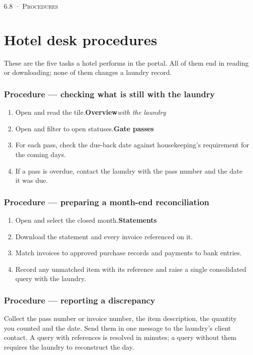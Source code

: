 \documentclass[11pt,a4paper,oneside]{book}
\begin{document}
\textsc{\small\color{crimson}6.8 · Procedures}\par\medskip
\section*{Hotel desk procedures}
These are the five tasks a hotel performs in the portal. All of them end in reading or downloading; none of them changes a laundry record.

\subsubsection*{Procedure — checking what is still with the laundry}
\begin{enumerate}
\item Open  and read the  tile.\textbf{Overview}\emph{with the laundry}
\item Open  and filter to open statuses.\textbf{Gate passes}
\item For each pass, check the due-back date against housekeeping's requirement for the coming days.
\item If a pass is overdue, contact the laundry with the pass number and the date it was due.
\end{enumerate}
\subsubsection*{Procedure — preparing a month-end reconciliation}
\begin{enumerate}
\item Open  and select the closed month.\textbf{Statements}
\item Download the statement and every invoice referenced on it.
\item Match invoices to approved purchase records and payments to bank entries.
\item Record any unmatched item with its reference and raise a single consolidated query with the laundry.
\end{enumerate}
\subsubsection*{Procedure — reporting a discrepancy}
Collect the pass number or invoice number, the item description, the quantity you counted and the date. Send them in one message to the laundry's client contact. A query with references is resolved in minutes; a query without them requires the laundry to reconstruct the day.
\end{document}
